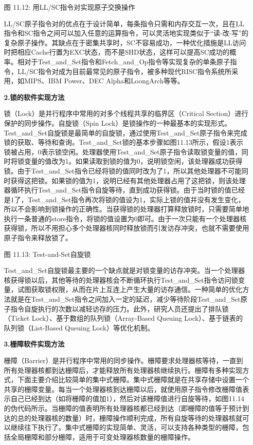 \documentclass[]{ctexbook}
\begin{document}
图 11.12: 用LL/SC指令对实现原子交换操作

LL/SC原子指令对的优点在于设计简单，每条指令只需和内存交互一次，且在LL指令和SC指令之间可以加入任意的运算指令，可以灵活地实现类似于``读-改-写''的复杂原子操作。其缺点在于密集共享时，SC不容易成功，一种优化措施是LL访问时把相应Cache行置为EXC状态，而不是SHD状态，这样可以提高SC成功的概率。相对于Test\_and\_Set指令和Fetch\_and\_Op指令等实现复杂的单条原子指令，LL/SC指令对成为目前最常见的原子指令，被多种现代RISC指令系统所采用，如MIPS、IBM Power、DEC Alpha和LoongArch等等。

\textbf{2.锁的软件实现方法}

锁（Lock）是并行程序中常用的对多个线程共享的临界区（Critical Section）进行保护的同步操作。自旋锁（Spin Lock）是锁操作的一种最基本的实现形式。Test\_and\_Set自旋锁是最简单的自旋锁，通过使用Test\_and\_Set原子指令来完成锁的获取、等待和查询。Test\_and\_Set锁的基本步骤如图11.13所示，假设1表示锁被占用，0表示锁空闲。处理器使用Test\_and\_Set原子指令读取锁变量的值，同时将锁变量的值改为1。如果读取到锁的值为0，说明锁空闲，该处理器成功获得锁。由于Test\_and\_Set指令已经将锁的值同时改为了1，所以其他处理器不可能同时获得这把锁。如果锁的值为1，说明已经有其他处理器占用了这把锁，则该处理器循环执行Test\_and\_Set指令自旋等待，直到成功获得锁。由于当时锁的值已经是1了，Test\_and\_Set指令再次将锁的值设为1，实际上锁的值并没有发生变化，所以不会影响到锁操作的正确性。当获得锁的处理器打算释放锁时，只需要简单地执行一条普通的store指令，将锁的值设置为0即可。由于一次只能有一个处理器核获得锁，所以不用担心多个处理器核同时释放锁而引发访存冲突，也就不需要使用原子指令来释放锁了。

图 11.13: Test-and-Set自旋锁

Test\_and\_Set自旋锁最主要的一个缺点就是对锁变量的访存冲突。当一个处理器核获得锁以后，其他等待的处理器核会不断循环执行Test\_and\_Set指令访问锁变量，试图获取锁权限，从而在片上互连上产生大量的访存通信。一种简单的优化方法就是在Test\_and\_Set指令之间加入一定的延迟，减少等待阶段Test\_and\_Set原子指令自旋执行的次数以减轻访存的压力。此外，研究人员还提出了排队锁（Ticket Lock）、基于数组的队列锁（Array-Based Queuing Lock）、基于链表的队列锁（List-Based Queuing Lock）等优化机制。

\textbf{3.栅障软件实现方法}

栅障（Barrier）是并行程序中常用的同步操作。栅障要求处理器核等待，一直到所有处理器核都到达栅障后，才能释放所有处理器核继续执行。栅障有多种实现方式，下面主要介绍比较简单的集中式栅障。集中式栅障就是在共享存储中设置一个共享的栅障变量。每当一个处理器核到达栅障以后，就使用原子指令修改栅障值表示自己已经到达（如将栅障的值加1），然后对该栅障值进行自旋等待，如图11.14的伪代码所示。当栅障的值表明所有处理器核都已经到达（即栅障的值等于预计到达的总的处理器核的数量）时，栅障操作顺利完成，所有自旋等待的处理器核就可以继续往下执行了。集中式栅障的实现简单、灵活，可以支持各种类型的栅障，包括全局栅障和部分栅障，适用于可变处理器核数量的栅障操作。
\end{document}
